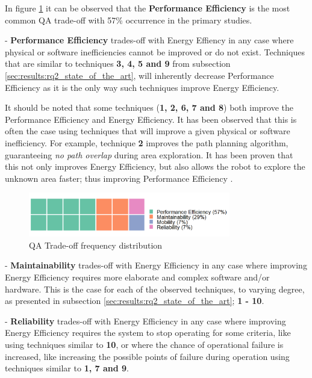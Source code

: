 In figure \ref{fig:trade_off_freq} it can be observed that the \textbf{Performance Efficiency} is the most common QA trade-off with 57\% occurrence in the primary studies.

\vspace{2mm}

- \textbf{Performance Efficiency} trades-off with Energy Effiency in any case where physical or software inefficiencies cannot be improved or do not exist. 
Techniques that are similar to techniques \textbf{3, 4, 5 and 9} from subsection \ref{sec:results:rq2_state_of_the_art}, 
will inherently decrease Performance Efficiency as it is the only way such techniques improve Energy Efficiency.

\vspace{2mm}

It should be noted that some techniques (\textbf{1, 2, 6, 7 and 8}) both improve the Performance Efficiency and Energy Efficiency. 
It has been observed that this is often the case using techniques that will improve a given physical or software inefficiency. 
For example, technique \textbf{2} improves the path planning algorithm, guaranteeing \textit{no path overlap} during area exploration. 
It has been proven that this not only improves Energy Efficiency, but also allows the robot to explore the unknown area faster; 
thus improving Performance Efficiency \cite{mei2006mobile_exploration}.

\vspace{2mm}

\begin{figure}[t]
    \includegraphics[width=250pt]{figures/waffle_tradeoff_freq.png}
    \caption{QA Trade-off frequency distribution}
    \label{fig:trade_off_freq}
\end{figure}

- \textbf{Maintainability} trades-off with Energy Efficiency in any case where improving Energy Efficiency requires more elaborate and complex software and/or hardware. 
This is the case for each of the observed techniques, to varying degree, as presented in subsection \ref{sec:results:rq2_state_of_the_art}; \textbf{1 - 10}.

\vspace{2mm}

- \textbf{Reliability} trades-off with Energy Efficiency in any case where improving Energy Efficiency requires the system to 
stop operating for some criteria, like using techniques similar to \textbf{10}, or where the chance of operational failure is increased, 
like increasing the possible points of failure during operation using techniques similar to \textbf{1, 7 and 9}. 

